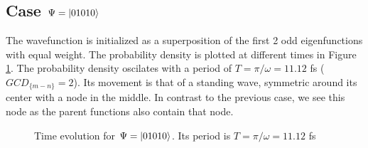 \documentclass{cis320}
\begin{document}
\subsection{Case $\Psi = \ket{01010}$}

The wavefunction is initialized as a superposition of the first 2 odd eigenfunctions with equal weight. The probability density is plotted at different times in Figure \ref{fig:H01010}. The probability density oscilates with a period of $T=\pi/\omega=11.12$ fs ( $GCD_{\{m-n\}}=2$).  Its movement is that of a standing wave, symmetric around its center with a node in the middle. In contrast to the previous case, we see this node as the parent functions also contain that node.
\begin{figure}[h!]
    \centering
    \caption{Time evolution for $\Psi = \ket{01010}$. Its period is $T=\pi/\omega=11.12$ fs}
    \label{fig:H01010}
\end{figure}
\end{document}
